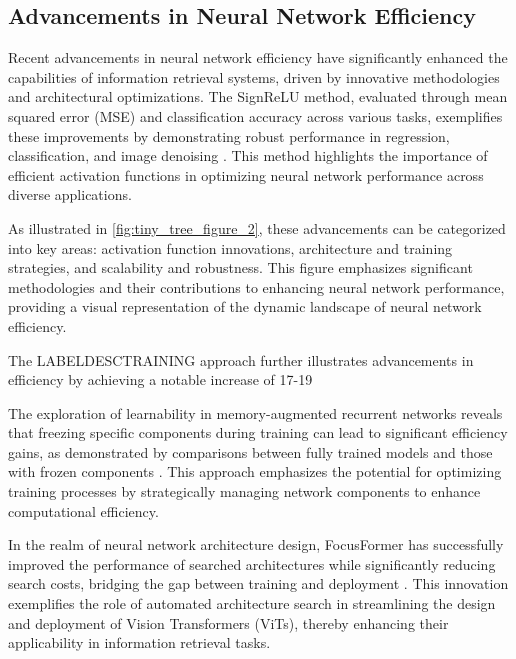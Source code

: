 \subsection{Advancements in Neural Network Efficiency} \label{subsec:Advancements in Neural Network Efficiency}

Recent advancements in neural network efficiency have significantly enhanced the capabilities of information retrieval systems, driven by innovative methodologies and architectural optimizations. The SignReLU method, evaluated through mean squared error (MSE) and classification accuracy across various tasks, exemplifies these improvements by demonstrating robust performance in regression, classification, and image denoising \cite{li2023signreluneuralnetworkapproximation}. This method highlights the importance of efficient activation functions in optimizing neural network performance across diverse applications.

As illustrated in \autoref{fig:tiny_tree_figure_2}, these advancements can be categorized into key areas: activation function innovations, architecture and training strategies, and scalability and robustness. This figure emphasizes significant methodologies and their contributions to enhancing neural network performance, providing a visual representation of the dynamic landscape of neural network efficiency.

The LABELDESCTRAINING approach further illustrates advancements in efficiency by achieving a notable increase of 17-19%

The exploration of learnability in memory-augmented recurrent networks reveals that freezing specific components during training can lead to significant efficiency gains, as demonstrated by comparisons between fully trained models and those with frozen components \cite{das2024exploringlearnabilitymemoryaugmentedrecurrent}. This approach emphasizes the potential for optimizing training processes by strategically managing network components to enhance computational efficiency.

In the realm of neural network architecture design, FocusFormer has successfully improved the performance of searched architectures while significantly reducing search costs, bridging the gap between training and deployment \cite{liu2022focusformerfocusingneedarchitecture}. This innovation exemplifies the role of automated architecture search in streamlining the design and deployment of Vision Transformers (ViTs), thereby enhancing their applicability in information retrieval tasks.

